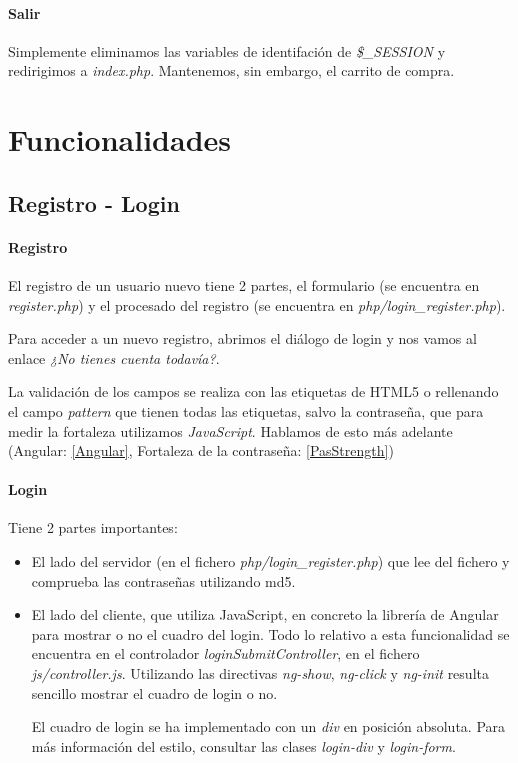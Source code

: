 \documentclass{apuntes}
\begin{document}
\paragraph{Salir}

Simplemente eliminamos las variables de identifación de \textit{\$\_SESSION} y redirigimos a \textit{index.php}. Mantenemos, sin embargo, el carrito de compra.


\section{Funcionalidades}

\subsection{Registro - Login}

\paragraph{Registro}

El registro de un usuario nuevo tiene 2 partes, el formulario (se encuentra en \textit{register.php}) y el procesado del registro (se encuentra en \textit{php/login\_register.php}).

Para acceder a un nuevo registro, abrimos el diálogo de login y nos vamos al enlace \textit{¿No tienes cuenta todavía?}. 

La validación de los campos se realiza con las etiquetas de HTML5 o rellenando el campo \textit{pattern} que tienen todas las etiquetas, salvo la contraseña, que para medir la fortaleza utilizamos \textit{JavaScript}. Hablamos de esto más adelante (Angular: \ref{Angular}, Fortaleza de la contraseña: \ref{PasStrength})

\paragraph{Login}

Tiene 2 partes importantes:

\begin{itemize}

\item El lado del servidor (en el fichero \textit{php/login\_register.php}) que lee del fichero y comprueba las contraseñas utilizando md5.

\item El lado del cliente, que utiliza JavaScript, en concreto la librería de Angular para mostrar o no el cuadro del login. Todo lo relativo a esta funcionalidad se encuentra en el controlador \textit{loginSubmitController}, en el fichero \textit{js/controller.js}. Utilizando las directivas \textit{ng-show}, \textit{ng-click} y \textit{ng-init} resulta sencillo mostrar el cuadro de login o no. 

El cuadro de login se ha implementado con un \textit{div} en posición absoluta. Para más información del estilo, consultar las clases \textit{login-div} y \textit{login-form}.

\end{itemize}
\end{document}
